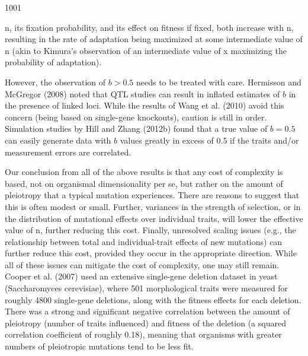 \documentclass{article}
\begin{document}
1001

n, its fixation probability, and its effect on fitness if fixed, both increase with n, resulting in the rate of adaptation being maximized at some intermediate value of n (akin to Kimura's observation of an intermediate value of x maximizing the probability of adaptation).

However, the observation of $b > 0.5$ needs to be treated with care. Hermisson and McGregor (2008) noted that QTL studies can result in inflated estimates of $b$ in the presence of linked loci. While the results of Wang et al. (2010) avoid this concern (being based on single-gene knockouts), caution is still in order. Simulation studies by Hill and Zhang (2012b) found that a true value of $b = 0.5$ can easily generate data with $b$ values greatly in excess of 0.5 if the traits and/or measurement errors are correlated.

Our conclusion from all of the above results is that any cost of complexity is based, not on organismal dimensionality per se, but rather on the amount of pleiotropy that a typical mutation experiences. There are reasons to suggest that this is often modest or small. Further, variances in the strength of selection, or in the distribution of mutational effects over individual traits, will lower the effective value of n, further reducing this cost. Finally, unresolved scaling issues (e.g., the relationship between total and individual-trait effects of new mutations) can further reduce this cost, provided they occur in the appropriate direction. While all of these issues can mitigate the cost of complexity, one may still remain. Cooper et al. (2007) used an extensive single-gene deletion dataset in yeast (Saccharomyces cerevisiae), where 501 morphological traits were measured for roughly 4800 single-gene deletions, along with the fitness effects for each deletion. There was a strong and significant negative correlation between the amount of pleiotropy (number of traits influenced) and fitness of the deletion (a squared correlation coefficient of roughly 0.18), meaning that organisms with greater numbers of pleiotropic mutations tend to be less fit.
\end{document}
